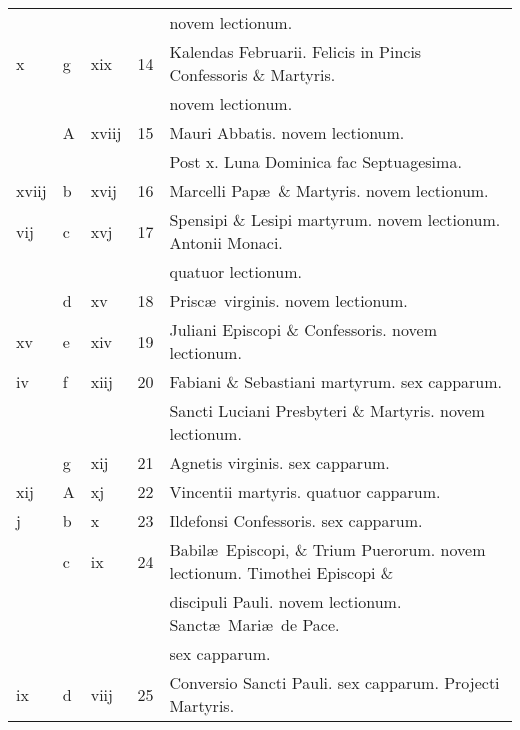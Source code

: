 \documentclass[letter,11pt]{book}
\begin{document}
\begin{center}
\begin{tabular}{l | l | l | r | l}
 &  & & & \quad \color{Red} novem lectionum. \\
\color{Red} x & g & \color{Red} xix & 14 & \color{Red} Kalendas Februarii. \color{black} Felicis in Pincis Confessoris \& Martyris. \\
 &  &  &  & \quad \color{Red} novem lectionum. \\
 & \color{Red} A & \color{Red} xviij & 15 & Mauri Abbatis. \color{Red} novem lectionum. \\
 &  & & & \qquad \color{Red} Post x. Luna Dominica fac Septuagesima. \\
\color{Red} xviij & b & \color{Red} xvij & 16 & Marcelli Pap\ae \ \& Martyris. \color{Red} novem lectionum. \\
\color{Red} vij & c & \color{Red} xvj & 17 & Spensipi \& Lesipi martyrum. \color{Red} novem lectionum. \color{black} Antonii Monaci. \\%
 &  &  &  & \quad \color{Red} quatuor lectionum. \\
 & d & \color{Red} xv & 18 & Prisc\ae \ virginis. \color{Red} novem lectionum. \\
\color{Red} xv & e & \color{Red} xiv & 19 & Juliani Episcopi \& Confessoris. \color{Red} novem lectionum. \\
\color{Red} iv & f & \color{Red} xiij & 20 & \color{Red} Fabiani \& Sebastiani martyrum. \color{black} sex capparum. \\
 &  &  &  & \quad Sancti Luciani Presbyteri \& Martyris. \color{Red} novem lectionum. \\
 & g & \color{Red} xij & 21 & Agnetis virginis. \color{Red} sex capparum. \\
\color{Red} xij & \color{Red} A & \color{Red} xj & 22 & Vincentii martyris. \color{Red} quatuor capparum. \\%
\color{Red} j & b & \color{Red} x & 23 & \color{Red} Ildefonsi Confessoris. \color{black} sex capparum. \\
 & c & \color{Red} ix & 24 & Babil\ae \ Episcopi, \& Trium Puerorum. \color{Red} novem lectionum. \color{black} Timothei Episcopi \& \\
 &  &  &  & \quad discipuli Pauli. \color{Red} novem lectionum. \color{black} Sanct\ae \ Mari\ae \ de Pace. \\
 &  &  &  & \quad \color{Red} sex capparum. \\
\color{Red} ix & d & \color{Red} viij & 25 & Conversio Sancti Pauli. \color{Red} sex capparum. \color{black} Projecti Martyris. \\

\end{tabular}
\end{center}
\end{document}
